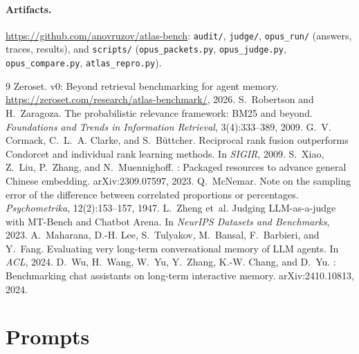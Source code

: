 \documentclass[11pt]{article}
\begin{document}
\paragraph{Artifacts.} \url{https://github.com/anovruzov/atlas-bench}: \texttt{audit/}, \texttt{judge/}, \texttt{opus\_run/} (answers, traces, results), and \texttt{scripts/} (\texttt{opus\_packets.py}, \texttt{opus\_judge.py}, \texttt{opus\_compare.py}, \texttt{atlas\_repro.py}).


\begin{thebibliography}{9}
 Zeroset.  v0: Beyond retrieval benchmarking for agent memory. \newblock \url{https://zeroset.com/research/atlas-benchmark/}, 2026.
 S.~Robertson and H.~Zaragoza. \newblock The probabilistic relevance framework: {BM25} and beyond. \newblock \emph{Foundations and Trends in Information Retrieval}, 3(4):333--389, 2009.
 G.~V. Cormack, C.~L.~A. Clarke, and S.~B{\"u}ttcher. \newblock Reciprocal rank fusion outperforms {Condorcet} and individual rank learning methods. \newblock In \emph{SIGIR}, 2009.
 S.~Xiao, Z.~Liu, P.~Zhang, and N.~Muennighoff. : Packaged resources to advance general {Chinese} embedding. \newblock arXiv:2309.07597, 2023.
 Q.~McNemar. \newblock Note on the sampling error of the difference between correlated proportions or percentages. \newblock \emph{Psychometrika}, 12(2):153--157, 1947.
 L.~Zheng et~al. \newblock Judging {LLM-as-a-judge} with {MT-Bench} and {Chatbot Arena}. \newblock In \emph{NeurIPS Datasets and Benchmarks}, 2023.
 A.~Maharana, D.-H. Lee, S.~Tulyakov, M.~Bansal, F.~Barbieri, and Y.~Fang. \newblock Evaluating very long-term conversational memory of {LLM} agents. \newblock In \emph{ACL}, 2024.
 D.~Wu, H.~Wang, W.~Yu, Y.~Zhang, K.-W. Chang, and D.~Yu. : Benchmarking chat assistants on long-term interactive memory. \newblock arXiv:2410.10813, 2024.
\end{thebibliography}

\appendix
\section{Prompts}\label{app:prompts}
\end{document}
